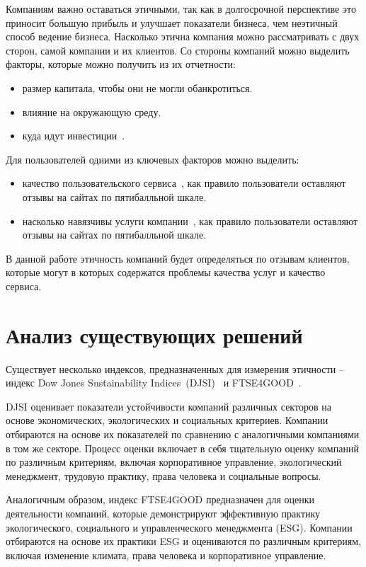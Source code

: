 \documentclass[PI, VKR]{HSEUniversity}
\begin{document}
Компаниям важно оставаться этичными, так как в долгосрочной перспективе это приносит большую прибыль и улучшает показатели бизнеса, чем неэтичный способ ведение бизнеса\autocites{climent_ethical_2018}[][]{mure_esg_2021}. Насколько этична компания можно рассматривать с двух сторон, самой компании и их клиентов. Со стороны компаний можно выделить факторы, которые можно получить из их отчетности:
\begin{itemize}
\item размер капитала, чтобы они не могли обанкротиться.
\item влияние на окружающую среду.
\item куда идут инвестиции~\autocite{harvey_ethical_1995}.
\end{itemize}
Для пользователей одними из ключевых факторов можно выделить:
\begin{itemize}
\item качество пользовательского сервиса~\autocite{brunk_exploring_2010}, как правило пользователи оставляют отзывы на сайтах по пятибалльной шкале.
\item насколько навязчивы услуги компании~\autocite{mitchell_bank_1992}, как правило пользователи оставляют отзывы на сайтах по пятибалльной шкале.
\end{itemize}

В данной работе этичность компаний будет определяться по отзывам клиентов, которые могут в которых содержатся проблемы качества услуг и качество сервиса.
\section{Анализ существующих решений}
\label{sec:orgcc0eed3}
Существует несколько индексов, предназначенных для измерения этичности -- индекс Dow Jones Sustainability Indices~(DJSI)~\autocite{lopez_sustainable_2007} и FTSE4GOOD~\autocite{collison_financial_2008}.

DJSI оценивает показатели устойчивости компаний различных секторов на основе экономических, экологических и социальных критериев. Компании отбираются на основе их показателей по сравнению с аналогичными компаниями в том же секторе. Процесс оценки включает в себя тщательную оценку компаний по различным критериям, включая корпоративное управление, экологический менеджмент, трудовую практику, права человека и социальные вопросы.

Аналогичным образом, индекс FTSE4GOOD предназначен для оценки деятельности компаний, которые демонстрируют эффективную практику экологического, социального и управленческого менеджмента (ESG). Компании отбираются на основе их практики ESG и оцениваются по различным критериям, включая изменение климата, права человека и корпоративное управление.
\end{document}
